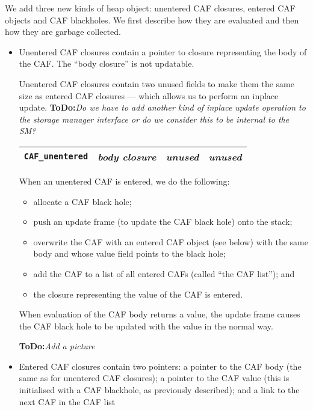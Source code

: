 \documentclass[11pt]{article}
\newcommand{\ToDo}[1]{{{\bf ToDo:}\sl #1}}
\begin{document}
We add three new kinds of heap object: unentered CAF closures, entered
CAF objects and CAF blackholes.  We first describe how they are
evaluated and then how they are garbage collected.
\begin{itemize}
\item
Unentered CAF closures contain a pointer to closure representing the
body of the CAF.  The ``body closure'' is not updatable.

Unentered CAF closures contain two unused fields to make them the same
size as entered CAF closures --- which allows us to perform an inplace
update.  \ToDo{Do we have to add another kind of inplace update operation
to the storage manager interface or do we consider this to be internal
to the SM?}
\begin{center}
\begin{tabular}{|l|l|l|l|}\hline
\verb+CAF_unentered+ & \emph{body closure} & \emph{unused} & \emph{unused} \\ \hline
\end{tabular}
\end{center}
When an unentered CAF is entered, we do the following:
\begin{itemize}
\item
allocate a CAF black hole;

\item
push an update frame (to update the CAF black hole) onto the stack;

\item
overwrite the CAF with an entered CAF object (see below) with the same
body and whose value field points to the black hole;

\item
add the CAF to a list of all entered CAFs (called ``the CAF list'');
and

\item
the closure representing the value of the CAF is entered.

\end{itemize}

When evaluation of the CAF body returns a value, the update frame
causes the CAF black hole to be updated with the value in the normal
way.

\ToDo{Add a picture}

\item
Entered CAF closures contain two pointers: a pointer to the CAF body
(the same as for unentered CAF closures); a pointer to the CAF value
(this is initialised with a CAF blackhole, as previously described);
and a link to the next CAF in the CAF list 


\end{itemize}
\end{document}
